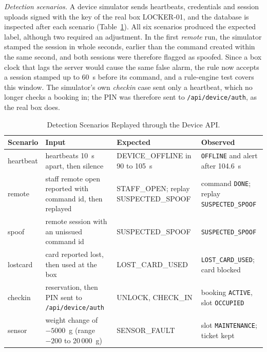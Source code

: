 \documentclass[journal,onecolumn]{IEEEtran}
\begin{document}
\textit{Detection scenarios.} A device simulator sends heartbeats, credentials and session uploads signed with the key
of the real box LOCKER-01, and the database is inspected after each scenario (Table~\ref{tab:scen}). All six scenarios
produced the expected label, although two required an adjustment. In the first \emph{remote} run, the simulator
stamped the session in whole seconds, earlier than the command created within the same second, and both sessions were
therefore flagged as spoofed. Since a box clock that lags the server would cause the same false alarm, the rule now
accepts a session stamped up to 60~s before its command, and a rule-engine test covers this window. The simulator's
own \emph{checkin} case sent only a heartbeat, which no longer checks a booking in; the PIN was therefore sent to
\texttt{/api/device/auth}, as the real box does.

\begin{table}[!htbp]
\renewcommand{\arraystretch}{1.02}
\centering
\small
\caption{Detection Scenarios Replayed through the Device API.}
\label{tab:scen}
\vspace{5pt}
\begin{tabular}{l >{\raggedright\arraybackslash}p{4.8cm} >{\raggedright\arraybackslash}p{3.6cm} >{\raggedright\arraybackslash}p{5.2cm}}
\hline
Scenario & Input & Expected & Observed \\
\hline
heartbeat & 6 heartbeats 10~s apart, then silence & DEVICE\_OFFLINE in 90 to 105~s & \texttt{OFFLINE} and alert after 104.6~s \\
remote    & staff remote open reported with command id, then replayed & STAFF\_OPEN; replay SUSPECTED\_SPOOF & command \texttt{DONE}; replay \texttt{SUSPECTED\_SPOOF} \\
spoof     & remote session with an unissued command id & SUSPECTED\_SPOOF & \texttt{SUSPECTED\_SPOOF} \\
lostcard  & card reported lost, then used at the box & LOST\_CARD\_USED & \texttt{LOST\_CARD\_USED}; card blocked \\
checkin   & reservation, then PIN sent to \texttt{/api/device/auth} & UNLOCK, CHECK\_IN & booking \texttt{ACTIVE}, slot \texttt{OCCUPIED} \\
sensor    & weight change of $-5000$~g (range $-200$ to 20\,000~g) & SENSOR\_FAULT & slot \texttt{MAINTENANCE}; ticket kept \\
\hline
\end{tabular}
\end{table}
\end{document}
